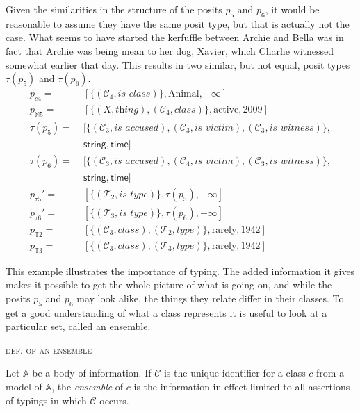 \documentclass[sfsidenotes,nobib,twoside,symmetric]{tufte-handout}
\newcommand{\typeof}[1]{\tau(#1)}
\newcounter{majorcount}
\newcommand{\deffy}[3]{
	\vspace{2ex}
	\refstepcounter{majorcount} 
	\noindent\textsc{#1}%
	\\\begin{small}
	\noindent #2%
	\label{Def:#3}
	\end{small}
	\vspace{2ex}
}
\begin{document}
Given the similarities in the structure of the posits $p_{5}$ and $p_{6}$, it would be reasonable to assume they have the same posit type, but that is actually not the case. What seems to have started the kerfuffle between Archie and Bella was in fact that Archie was being mean to her dog, Xavier, which Charlie witnessed somewhat earlier that day. This results in two similar, but not equal, posit types $\typeof{p_{5}}$ and $\typeof{p_{6}}$.
\begin{align*}
p_{c4} =\;& [\{(\mathcal{C}_4, \textit{is class})\}, \textrm{Animal}, -\infty] \\
p_{\mathbb{M}5} =\;& [\{(X, \textit{thing}), (\mathcal{C}_4, \textit{class})\}, \textrm{active}, \textrm{2009}] \\
\typeof{p_{5}} =\;& [\{(\mathcal{C}_3, \textit{is accused}), (\mathcal{C}_3, \textit{is victim}), (\mathcal{C}_3, \textit{is witness})\}, \\
&\mathsf{string}, \mathsf{time}] \\
\typeof{p_{6}} =\;& [\{(\mathcal{C}_3, \textit{is accused}), (\mathcal{C}_4, \textit{is victim}), (\mathcal{C}_3, \textit{is witness})\}, \\
&\mathsf{string}, \mathsf{time}] \\
p_{\tau5}' =\;& [\{(\mathcal{T}_2, \textit{is type})\}, \typeof{p_{5}}, -\infty] \\
p_{\tau6}' =\;& [\{(\mathcal{T}_3, \textit{is type})\}, \typeof{p_{6}}, -\infty] \\
p_{\mathbb{T}2} =\;& [\{(\mathcal{C}_3, \textit{class}), (\mathcal{T}_2, \textit{type})\}, \textrm{rarely}, \textrm{1942}] \\
p_{\mathbb{T}3} =\;& [\{(\mathcal{C}_3, \textit{class}), (\mathcal{T}_3, \textit{type})\}, \textrm{rarely}, \textrm{1942}] 
\end{align*}

This example illustrates the importance of typing. The added information it gives makes it possible to get the whole picture of what is going on, and while the posits $p_5$ and $p_6$ may look alike, the things they relate differ in their classes. To get a good understanding of what a class represents it is useful to look at a particular set, called an ensemble.

\deffy{def. of an ensemble}{%
Let $\mathbb{A}$ be a body of information. If $\mathcal{C}$ is the unique identifier for a class $c$ from a model of $\mathbb{A}$, the \emph{ensemble} of $c$ is the information in effect limited to all assertions of typings in which $\mathcal{C}$ occurs. 
}{ensemble}
\end{document}
